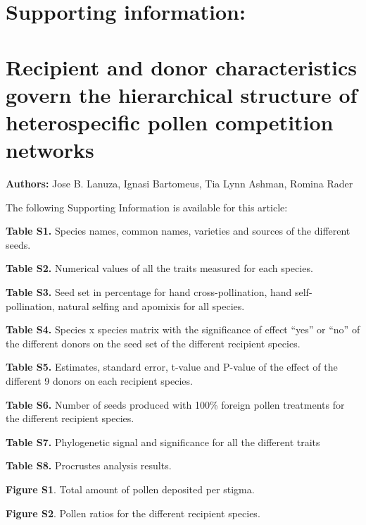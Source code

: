 \documentclass[
  12pt,
]{article}
\author{}
\date{\vspace{-2.5em}}
\begin{document}
\captionsetup[figure]{labelformat=empty}
\captionsetup[table]{labelformat=empty}
\renewcommand{\figurename}{}

\hypertarget{supporting-information}{%
\section{Supporting information:}\label{supporting-information}}

\hypertarget{recipient-and-donor-characteristics-govern-the-hierarchical-structure-of-heterospecific-pollen-competition-networks}{%
\section{Recipient and donor characteristics govern the hierarchical
structure of heterospecific pollen competition
networks}\label{recipient-and-donor-characteristics-govern-the-hierarchical-structure-of-heterospecific-pollen-competition-networks}}

\textbf{Authors:} Jose B. Lanuza, Ignasi Bartomeus, Tia Lynn Ashman,
Romina Rader

The following Supporting Information is available for this article:

\textbf{Table S1.} Species names, common names, varieties and sources of
the different seeds.

\textbf{Table S2.} Numerical values of all the traits measured for each
species.

\textbf{Table S3.} Seed set in percentage for hand cross-pollination,
hand self-pollination, natural selfing and apomixis for all species.

\textbf{Table S4.} Species x species matrix with the significance of
effect ``yes'' or ``no'' of the different donors on the seed set of the
different recipient species.

\textbf{Table S5.} Estimates, standard error, t-value and P-value of the
effect of the different 9 donors on each recipient species.

\textbf{Table S6.} Number of seeds produced with 100\% foreign pollen
treatments for the different recipient species.

\textbf{Table S7.} Phylogenetic signal and significance for all the
different traits

\textbf{Table S8.} Procrustes analysis results.

\textbf{Figure S1}. Total amount of pollen deposited per stigma.

\textbf{Figure S2}. Pollen ratios for the different recipient species.
\end{document}

